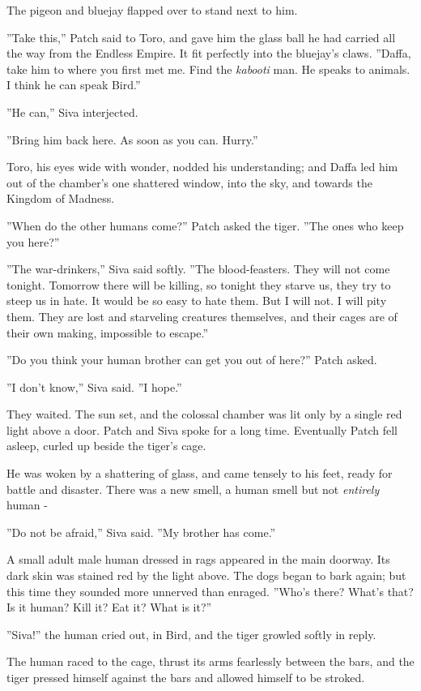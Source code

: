 \documentclass[11pt]{article}
\begin{document}
 The pigeon and bluejay flapped over to stand next to him.\par
 ''Take this,'' Patch said to Toro, and gave him the glass ball he had carried all the way from the Endless Empire. It fit perfectly into the bluejay's claws. ''Daffa, take him to where you first met me. Find the {\it kabooti} man. He speaks to animals. I think he can speak Bird.''\par
 ''He can,'' Siva interjected.\par
 ''Bring him back here. As soon as you can. Hurry.''\par
 Toro, his eyes wide with wonder, nodded his understanding; and Daffa led him out of the chamber's one shattered window, into the sky, and towards the Kingdom of Madness.\par
 ''When do the other humans come?'' Patch asked the tiger. ''The ones who keep you here?''\par
 ''The war-drinkers,'' Siva said softly. ''The blood-feasters. They will not come tonight. Tomorrow there will be killing, so tonight they starve us, they try to steep us in hate. It would be so easy to hate them. But I will not. I will pity them. They are lost and starveling creatures themselves, and their cages are of their own making, impossible to escape.''\par
 ''Do you think your human brother can get you out of here?'' Patch asked.\par
 ''I don't know,'' Siva said. ''I hope.''\par
 They waited. The sun set, and the colossal chamber was lit only by a single red light above a door. Patch and Siva spoke for a long time. Eventually Patch fell asleep, curled up beside the tiger's cage.\par
He was woken by a shattering of glass, and came tensely to his feet, ready for battle and disaster. There was a new smell, a human smell %
 but not {\it entirely} human -\par
 ''Do not be afraid,'' Siva said. ''My brother has come.''\par
 A small adult male human dressed in rags appeared in the main doorway. Its dark skin was stained red by the light above. The dogs began to bark again; but this time they sounded more unnerved than enraged. ''Who's there? What's that? Is it human? Kill it? Eat it? What is it?''\par
 ''Siva!'' the human cried out, in Bird, and the tiger growled softly in reply.\par
 The human raced to the cage, thrust its arms fearlessly between the bars, and the tiger pressed himself against the bars and allowed himself to be stroked.\par
\end{document}
